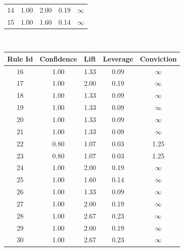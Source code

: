 \documentclass{article}
\begin{document}
\begin{table}[H]
\begin{tabular}{|c | c c c c|}
		14 & 1.00 & 2.00 & 0.19 & $\infty$ \\ 
		15 & 1.00 & 1.60 & 0.14 & $\infty$ \\ 
		\hline
	\end{tabular}~%
	\begin{tabular}{|c | c c c c|}
		\hline
		Rule Id & Confidence & Lift & Leverage & Conviction\\ \hline 
		16 & 1.00 & 1.33 & 0.09 & $\infty$ \\ 
		17 & 1.00 & 2.00 & 0.19 & $\infty$ \\ 
		18 & 1.00 & 1.33 & 0.09 & $\infty$ \\ 
		19 & 1.00 & 1.33 & 0.09 & $\infty$ \\ 
		20 & 1.00 & 1.33 & 0.09 & $\infty$ \\ 
		21 & 1.00 & 1.33 & 0.09 & $\infty$ \\ 
		22 & 0.80 & 1.07 & 0.03 & 1.25 \\ 
		23 & 0.80 & 1.07 & 0.03 & 1.25 \\ 
		24 & 1.00 & 2.00 & 0.19 & $\infty$ \\ 
		25 & 1.00 & 1.60 & 0.14 & $\infty$ \\ 
		26 & 1.00 & 1.33 & 0.09 & $\infty$ \\ 
		27 & 1.00 & 2.00 & 0.19 & $\infty$ \\ 
		28 & 1.00 & 2.67 & 0.23 & $\infty$ \\ 
		29 & 1.00 & 2.00 & 0.19 & $\infty$ \\ 
		30 & 1.00 & 2.67 & 0.23 & $\infty$ \\ 
		\hline
	\end{tabular}
\end{table}
\end{document}
